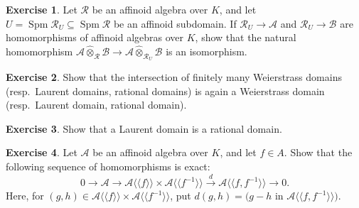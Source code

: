 \documentclass[a4paper,12pt, dvipdfmx]{jsbook}
\def\Spm{\mathop{\mathrm{Spm}}\nolimits}
\def\dl{\langle\!\langle}
\def\dr{\rangle\!\rangle}
\theoremstyle{plain}
\theoremstyle{definition}
\newtheorem{exer}{\bfseries Exercise}[chapter]
\begin{document}
\begin{exer}\label{exer-completetensorproductsaffinoidsubdomians}{\rm 
Let $\mathcal{R}$ be an affinoid algebra over $K$, and let $U=\Spm\mathcal{R}_U\subseteq\Spm\mathcal{R}$ be an affinoid subdomain.
If $\mathcal{R}_U\rightarrow\mathcal{A}$ and $\mathcal{R}_U\rightarrow\mathcal{B}$ are homomorphisms of affinoid algebras over $K$, show that the natural homomorphism $\mathcal{A}\widehat{\otimes}_{\mathcal{R}}\mathcal{B}\rightarrow\mathcal{A}\widehat{\otimes}_{\mathcal{R}_U}\mathcal{B}$ is an isomorphism.}
\end{exer}

\begin{exer}\label{exer-rationaldomainintersection}{\rm
Show that the intersection of finitely many Weierstrass domains (resp.\ Laurent domains, rational domains) is again a Weierstrass domain (resp.\ Laurent domain, rational domain).}
\end{exer}

\begin{exer}\label{exer-Laurentdomainration}{\rm 
Show that a Laurent domain is a rational domain.}
\end{exer}

\begin{exer}\label{exer-TateacyclicityLaurent}{\rm 
Let $\mathcal{A}$ be an affinoid algebra over $K$, and let $f\in A$.
Show that the following sequence of homomorphisms is exact:
$$
0\longrightarrow\mathcal{A}\longrightarrow\mathcal{A}\dl f\dr\times\mathcal{A}\dl f^{-1}\dr\stackrel{d}{\longrightarrow}\mathcal{A}\dl f,f^{-1}\dr\longrightarrow 0.
$$
Here, for $(g,h)\in\mathcal{A}\dl f\dr\times\mathcal{A}\dl f^{-1}\dr$, put $d(g,h)=(g-h$ in $\mathcal{A}\dl f,f^{-1}\dr)$.}
\end{exer}
\end{document}
